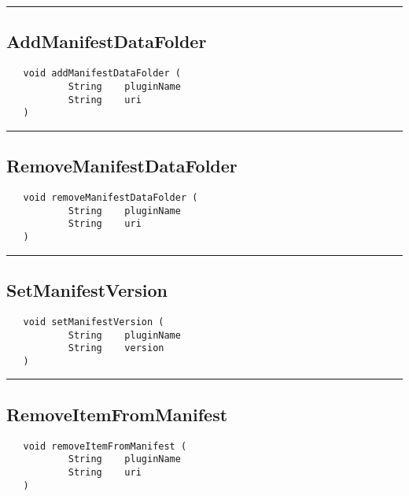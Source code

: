 \rule{15cm}{2pt}
\subsection{AddManifestDataFolder}
\label{Api:AddManifestDataFolder}
\begin{verbatim}
   void addManifestDataFolder (
           String    pluginName
           String    uri
   )
\end{verbatim}



\rule{15cm}{2pt}
\subsection{RemoveManifestDataFolder}
\label{Api:RemoveManifestDataFolder}
\begin{verbatim}
   void removeManifestDataFolder (
           String    pluginName
           String    uri
   )
\end{verbatim}



\rule{15cm}{2pt}
\subsection{SetManifestVersion}
\label{Api:SetManifestVersion}
\begin{verbatim}
   void setManifestVersion (
           String    pluginName
           String    version
   )
\end{verbatim}



\rule{15cm}{2pt}
\subsection{RemoveItemFromManifest}
\label{Api:RemoveItemFromManifest}
\begin{verbatim}
   void removeItemFromManifest (
           String    pluginName
           String    uri
   )
\end{verbatim}



